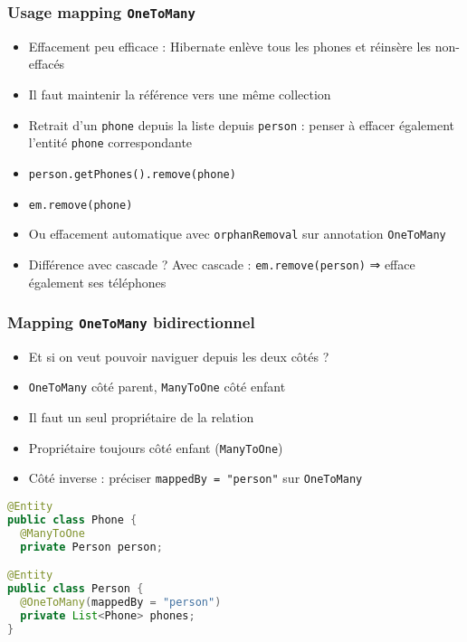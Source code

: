 \documentclass[english, french]{beamer}
\begin{document}
\begin{frame}
	\frametitle{Usage mapping \texttt{OneToMany}}
	\begin{itemize}
		\item Effacement peu efficace : Hibernate enlève tous les phones et réinsère les non-effacés
		\item Il faut maintenir la référence vers une même collection%
		\item Retrait d’un \texttt{phone} depuis la liste depuis \texttt{person} : penser à effacer également l’entité \texttt{phone} correspondante
		\item \texttt{person.getPhones().remove(phone)}
		\item \texttt{em.remove(phone)}
		\item Ou effacement automatique avec \texttt{orphanRemoval} sur annotation \texttt{OneToMany}
		\item Différence avec cascade ? \pause Avec cascade : \texttt{em.remove(person)} ⇒ efface également ses téléphones
	\end{itemize}
\end{frame}

\begin{frame}[fragile]
	\frametitle{Mapping \texttt{OneToMany} bidirectionnel}
	\begin{itemize}
		\item Et si on veut pouvoir naviguer depuis les deux côtés ?
		\item \texttt{OneToMany} côté parent, \texttt{ManyToOne} côté enfant
		\item Il faut un seul propriétaire de la relation
		\item Propriétaire toujours côté enfant (\texttt{ManyToOne})
		\item Côté inverse : préciser \texttt{mappedBy = "person"} sur \texttt{OneToMany}
	\end{itemize}
	\begin{lstlisting}[language=Java]
@Entity
public class Phone {
  @ManyToOne
  private Person person;

@Entity
public class Person {
  @OneToMany(mappedBy = "person")
  private List<Phone> phones;
}
	\end{lstlisting}
\end{frame}
\end{document}
